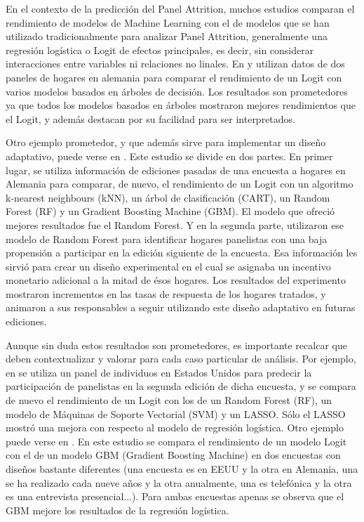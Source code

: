 En el contexto de la predicción del Panel Attrition, muchos estudios comparan el rendimiento de modelos de Machine Learning con el de modelos que se han utilizado tradicionalmente para analizar Panel Attrition, generalmente una regresión logística o Logit de efectos principales, es decir, sin considerar interacciones entre variables ni relaciones no linales. En \cite{kern2019tree} y \cite{kern2021predicting} utilizan datos de dos paneles de hogares en alemania para comparar el rendimiento de un Logit con varios modelos basados en árboles de decisión. Los resultados son prometedores ya que todos los modelos basados en árboles mostraron mejores rendimientos que el Logit, y además destacan por su facilidad para ser interpretados.

Otro ejemplo prometedor, y que además sirve para implementar un diseño adaptativo, puede verse en \cite{beste2023case}. Este estudio se divide en dos partes. En primer lugar, se utiliza información de ediciones pasadas de una encuesta a hogares en Alemania para comparar, de nuevo, el rendimiento de un Logit con un algoritmo k-nearest neighbours (kNN), un árbol de clasificación (CART), un Random Forest (RF) y un Gradient Boosting Machine (GBM). El modelo que ofreció mejores resultados fue el Random Forest. Y en la segunda parte, utilizaron ese modelo de Random Forest para identificar hogares panelistas con una baja propensión a participar en la edición siguiente de la encuesta. Esa información les sirvió para crear un diseño experimental en el cual se asignaba un incentivo monetario adicional a la mitad de ésos hogares. Los resultados del experimento mostraron incrementos en las tasas de respuesta de los hogares tratados, y animaron a sus responsables a seguir utilizando este diseño adaptativo en futuras ediciones.

Aunque sin duda estos resultados son prometedores, es importante recalcar que deben contextualizar y valorar para cada caso particular de análisis. Por ejemplo, en \cite{liu2020using} se utiliza un panel de individuos en Estados Unidos para predecir la participación de panelistas en la segunda edición de dicha encuesta, y se compara de nuevo el rendimiento de un Logit con los de un Random Forest (RF), un modelo de Máquinas de Soporte Vectorial (SVM) y un LASSO. Sólo el LASSO mostró una mejora con respecto al modelo de regresión logística. Otro ejemplo puede verse en \cite{jankowsky2022validation}. En este estudio se compara el rendimiento de un modelo Logit con el de un modelo GBM (Gradient Boosting Machine) en dos encuestas con diseños bastante diferentes (una encuesta es en EEUU y la otra en Alemania, una se ha realizado cada nueve años y la otra anualmente, una es telefónica y la otra es una entrevista presencial...). Para ambas encuestas apenas se observa que el GBM mejore los resultados de la regresión logística.

